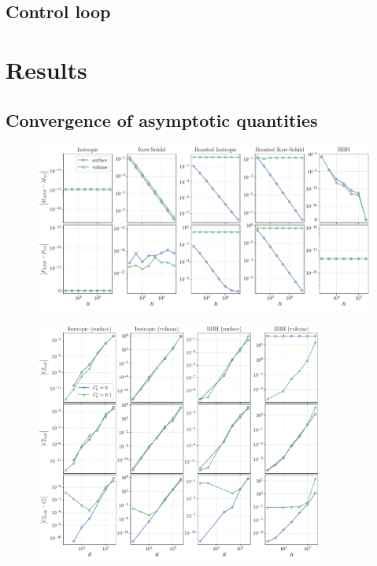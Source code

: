 \documentclass{../document}
\begin{document}


    \subsection{Control loop}
  
  \section{Results}

    \subsection{Convergence of asymptotic quantities}

      \begin{figure}
        \centering
        \includegraphics[width=\textwidth]{../../plots/final_report/distance_convergence_Madm_Padm.pdf}
        \caption{}
      \end{figure}

      \begin{figure}
        \centering
        \includegraphics[width=0.85\textwidth]{../../plots/final_report/distance_convergence_CoM.pdf}
        \caption{}
      \end{figure}
\end{document}
